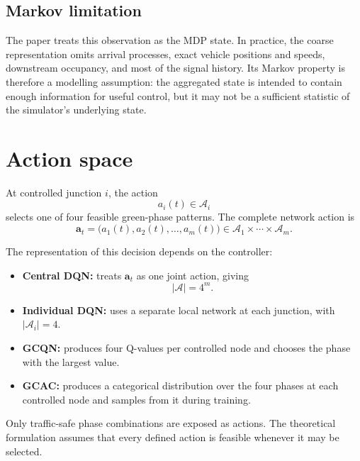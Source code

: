 \documentclass[11pt]{article}
\begin{document}
\subsection{Markov limitation}

The paper treats this observation as the MDP state. In practice, the coarse representation omits arrival processes, exact vehicle positions and speeds, downstream occupancy, and most of the signal history. Its Markov property is therefore a modelling assumption: the aggregated state is intended to contain enough information for useful control, but it may not be a sufficient statistic of the simulator's underlying state.

\section{Action space}

At controlled junction $i$, the action
\begin{equation}
a_i(t)\in\mathcal{A}_i
\end{equation}
selects one of four feasible green-phase patterns. The complete network action is
\begin{equation}
\mathbf{a}_t
=\bigl(a_1(t),a_2(t),\ldots,a_m(t)\bigr)
\in\mathcal{A}_1\times\cdots\times\mathcal{A}_m.
\end{equation}

The representation of this decision depends on the controller:
\begin{itemize}
    \item \textbf{Central DQN:} treats $\mathbf{a}_t$ as one joint action, giving
    \begin{equation}
    |\mathcal{A}|=4^m.
    \end{equation}
    \item \textbf{Individual DQN:} uses a separate local network at each junction, with $|\mathcal{A}_i|=4$.
    \item \textbf{GCQN:} produces four Q-values per controlled node and chooses the phase with the largest value.
    \item \textbf{GCAC:} produces a categorical distribution over the four phases at each controlled node and samples from it during training.
\end{itemize}

Only traffic-safe phase combinations are exposed as actions. The theoretical formulation assumes that every defined action is feasible whenever it may be selected.
\end{document}
